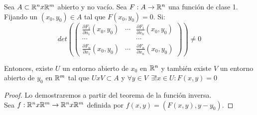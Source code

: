 \begin{nth}
	Sea $A \subset \mathbb{R}^n x\mathbb{R}^m$ abierto y no vacío. Sea $F: A \to \mathbb{R}^n$ una función de clase 1. Fijando un $(x_0,y_0) \in A$ tal que $F(x_0,y_0) = 0$. Si:
	\[
	det(\begin{pmatrix}
 \frac{\partial F_1}{\partial n_1}(x_0,y_0) & \cdots & \frac{\partial F_1}{\partial x_n}(x_0,y_0) \\
 \cdots& & \cdots\\

 \frac{\partial F_n}{\partial x_1}(x_0,y_0) & \cdots & \frac{\partial F_n}{\partial x_n} (x_0,y_0)
\end{pmatrix}) \ne 0
	\]

	Entonces, existe $U$ un entorno abierto de $x_0$ en $\mathbb{R}^n$ y también existe $V$ un entorno abierto de $y_0$ en $\mathbb{R}^m$ tal que $UxV \subset A$ y $\forall y \in V \ \ \exists! x \in U : F(x,y) = 0$
\end{nth}
\begin{proof}
	Lo demostraremos a partir del teorema de la función inversa.\\
	Sea $f:\mathbb{R}^nx\mathbb{R}^m \to \mathbb{R}^nx\mathbb{R}^m$ definida por $f(x,y) = (F(x,y),y-y_0)$.
\end{proof}

